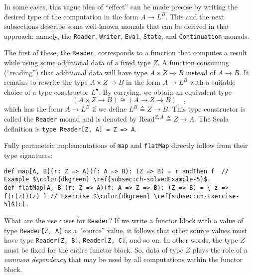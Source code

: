 In some cases, this vague idea of \textsf{``}effect\textsf{''} can be made precise
by writing the desired type of the computation in the form $A\rightarrow L^{B}$.
This and the next subsections describe some well-known monads that
can be derived in that approach: namely, the \lstinline!Reader!,
\lstinline!Writer!, \lstinline!Eval!, \lstinline!State!, and \lstinline!Continuation!
monads.

The first of these, the \lstinline!Reader!, corresponds to a function
that computes a result while using some additional data of a fixed
type $Z$. A function consuming (\textsf{``}reading\textsf{''}) that additional data
will have type $A\times Z\rightarrow B$ instead of $A\rightarrow B$.
It remains to rewrite the type $A\times Z\rightarrow B$ in the form
$A\rightarrow L^{B}$ with a suitable choice of a type constructor
$L^{\bullet}$. By currying, we obtain an equivalent type
\[
(A\times Z\rightarrow B)\cong(A\rightarrow Z\rightarrow B)\quad,
\]
which has the form $A\rightarrow L^{B}$ if we define $L^{B}\triangleq Z\rightarrow B$.
This type constructor is called the \lstinline!Reader! monad
and is denoted by $\text{Read}^{Z,A}\triangleq Z\rightarrow A$. The
Scala definition is \lstinline!type Reader[Z, A] = Z => A!.

Fully parametric implementations of \lstinline!map! and \lstinline!flatMap!
directly follow from their type signatures:
\begin{lstlisting}[mathescape=true]
def map[A, B](r: Z => A)(f: A => B): (Z => B) = r andThen f  // Example $\color{dkgreen} \ref{subsec:ch-solvedExample-5}$.
def flatMap[A, B](r: Z => A)(f: A => Z => B): (Z => B) = { z => f(r(z))(z) } // Exercise $\color{dkgreen} \ref{subsec:ch-Exercise-5}$(c).
\end{lstlisting}

What are the use cases for \lstinline!Reader!? If we write a functor
block with a value of type \lstinline!Reader[Z, A]! as a \textsf{``}source\textsf{''}
value, it follows that other source values must have type \lstinline!Reader[Z, B]!,
\lstinline!Reader[Z, C]!, and so on. In other words, the type $Z$
must be fixed for the entire functor block. So, data of type $Z$
plays the role of a \emph{common dependency} that may be used by all
computations within the functor block.

